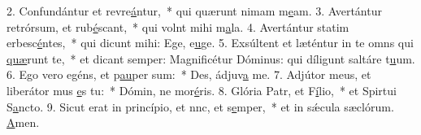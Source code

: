 2. Confundántur et revre\uline{á}ntur,~* qui quærunt nimam m\uline{e}am.
3. Avertántur retrórsum, et rub\uline{é}scant,~* qui volnt mihi m\uline{a}la.
4. Avertántur statim erbesc\uline{é}ntes,~* qui dicunt mihi: Ege, e\uline{u}ge.
5. Exsúltent et læténtur in te omns qui \uline{quæ}runt te,~* et dicant semper: Magnificétur Dóminus: qui díligunt saltáre t\uline{u}um.
6. Ego vero egéns, et p\uline{au}per sum:~* Des, ádjuv\uline{a} me.
7. Adjútor meus, et liberátor mus \uline{e}s tu:~* Dómin, ne mor\uline{é}ris.
8. Glória Patr, et F\uline{í}lio,~* et Spirtui S\uline{a}ncto.
9. Sicut erat in princípio, et nnc, et s\uline{e}mper,~* et in sǽcula sæclórum. \uline{A}men.
